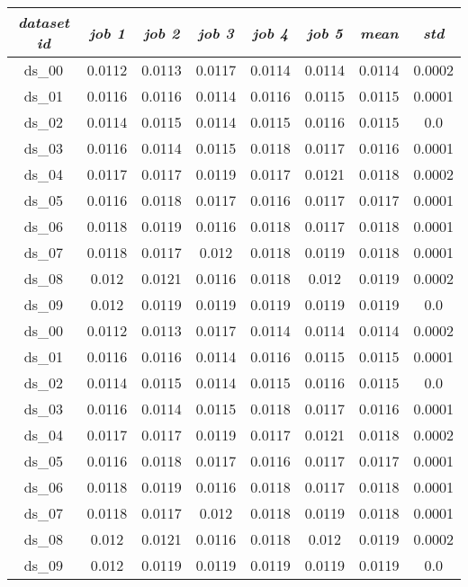 \begin{longtable}{|c|c|c|c|c|c|c|c|}
\hline
\textit{dataset id} & \textit{job 1} & \textit{job 2} & \textit{job 3} & \textit{job 4} & \textit{job 5} & \textit{mean} & \textit{std}\\ \hline
\endhead
ds\_00	& 0.0112	& 0.0113	& 0.0117	& 0.0114	& 0.0114	& 0.0114	& 0.0002	\\ \hline
ds\_01	& 0.0116	& 0.0116	& 0.0114	& 0.0116	& 0.0115	& 0.0115	& 0.0001	\\ \hline
ds\_02	& 0.0114	& 0.0115	& 0.0114	& 0.0115	& 0.0116	& 0.0115	& 0.0	\\ \hline
ds\_03	& 0.0116	& 0.0114	& 0.0115	& 0.0118	& 0.0117	& 0.0116	& 0.0001	\\ \hline
ds\_04	& 0.0117	& 0.0117	& 0.0119	& 0.0117	& 0.0121	& 0.0118	& 0.0002	\\ \hline
ds\_05	& 0.0116	& 0.0118	& 0.0117	& 0.0116	& 0.0117	& 0.0117	& 0.0001	\\ \hline
ds\_06	& 0.0118	& 0.0119	& 0.0116	& 0.0118	& 0.0117	& 0.0118	& 0.0001	\\ \hline
ds\_07	& 0.0118	& 0.0117	& 0.012	& 0.0118	& 0.0119	& 0.0118	& 0.0001	\\ \hline
ds\_08	& 0.012	& 0.0121	& 0.0116	& 0.0118	& 0.012	& 0.0119	& 0.0002	\\ \hline
ds\_09	& 0.012	& 0.0119	& 0.0119	& 0.0119	& 0.0119	& 0.0119	& 0.0	\\ \hline
ds\_00	& 0.0112	& 0.0113	& 0.0117	& 0.0114	& 0.0114	& 0.0114	& 0.0002	\\ \hline
ds\_01	& 0.0116	& 0.0116	& 0.0114	& 0.0116	& 0.0115	& 0.0115	& 0.0001	\\ \hline
ds\_02	& 0.0114	& 0.0115	& 0.0114	& 0.0115	& 0.0116	& 0.0115	& 0.0	\\ \hline
ds\_03	& 0.0116	& 0.0114	& 0.0115	& 0.0118	& 0.0117	& 0.0116	& 0.0001	\\ \hline
ds\_04	& 0.0117	& 0.0117	& 0.0119	& 0.0117	& 0.0121	& 0.0118	& 0.0002	\\ \hline
ds\_05	& 0.0116	& 0.0118	& 0.0117	& 0.0116	& 0.0117	& 0.0117	& 0.0001	\\ \hline
ds\_06	& 0.0118	& 0.0119	& 0.0116	& 0.0118	& 0.0117	& 0.0118	& 0.0001	\\ \hline
ds\_07	& 0.0118	& 0.0117	& 0.012	& 0.0118	& 0.0119	& 0.0118	& 0.0001	\\ \hline
ds\_08	& 0.012	& 0.0121	& 0.0116	& 0.0118	& 0.012	& 0.0119	& 0.0002	\\ \hline
ds\_09	& 0.012	& 0.0119	& 0.0119	& 0.0119	& 0.0119	& 0.0119	& 0.0	\\ \hline

\end{longtable}
